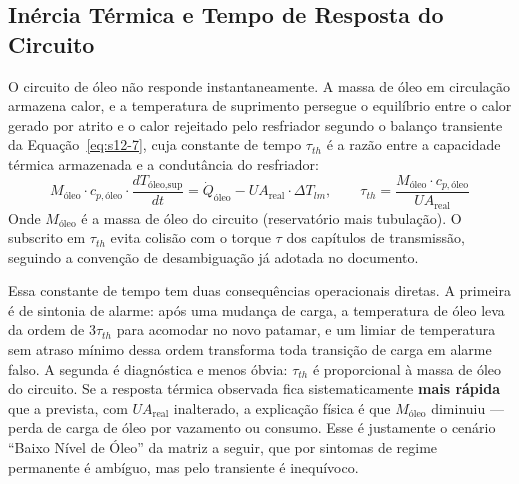 \documentclass[12pt,a4paper]{article}
\numberwithin{equation}{section}
\numberwithin{table}{section}
\numberwithin{figure}{section}
\begin{document}
{	\subsection{\textbf{Inércia Térmica e Tempo de Resposta do Circuito}}
	O circuito de óleo não responde instantaneamente. A massa de óleo em circulação armazena calor, e a temperatura de suprimento persegue o equilíbrio entre o calor gerado por atrito e o calor rejeitado pelo resfriador segundo o balanço transiente da Equação~\eqref{eq:s12-7}, cuja constante de tempo $\tau_{th}$ é a razão entre a capacidade térmica armazenada e a condutância do resfriador:
	\begin{equation}\label{eq:s12-7}
	M_{\text{óleo}} \cdot c_{p,\text{óleo}} \cdot \frac{dT_{\text{óleo,sup}}}{dt} = \dot{Q}_{\text{óleo}} - UA_{\text{real}} \cdot \Delta T_{lm}, \qquad \tau_{th} = \frac{M_{\text{óleo}} \cdot c_{p,\text{óleo}}}{UA_{\text{real}}}
	\end{equation}
	Onde $M_{\text{óleo}}$ é a massa de óleo do circuito (reservatório mais tubulação). O subscrito em $\tau_{th}$ evita colisão com o torque $\tau$ dos capítulos de transmissão, seguindo a convenção de desambiguação já adotada no documento.

	Essa constante de tempo tem duas consequências operacionais diretas. A primeira é de sintonia de alarme: após uma mudança de carga, a temperatura de óleo leva da ordem de $3\tau_{th}$ para acomodar no novo patamar, e um limiar de temperatura sem atraso mínimo dessa ordem transforma toda transição de carga em alarme falso. A segunda é diagnóstica e menos óbvia: $\tau_{th}$ é proporcional à massa de óleo do circuito. Se a resposta térmica observada fica sistematicamente \textbf{mais rápida} que a prevista, com $UA_{\text{real}}$ inalterado, a explicação física é que $M_{\text{óleo}}$ diminuiu — perda de carga de óleo por vazamento ou consumo. Esse é justamente o cenário ``Baixo Nível de Óleo'' da matriz a seguir, que por sintomas de regime permanente é ambíguo, mas pelo transiente é inequívoco.

}
\end{document}
